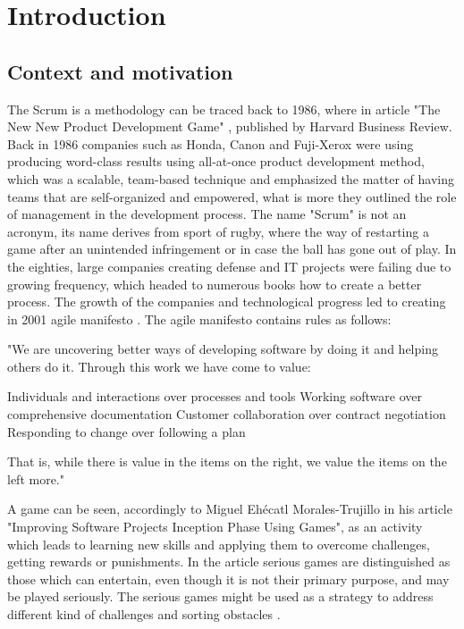 \chapter{Introduction}
\section{Context and motivation}
The Scrum is a methodology can be traced back to 1986, where in article "The New New Product Development Game" \cite{ScrumHarvardBib, ScrumBook}, published by Harvard Business Review. Back in 1986 companies such as Honda, Canon and Fuji-Xerox were using producing word-class results using all-at-once product development method, which was a scalable, team-based technique and emphasized the matter of having teams that are self-organized and empowered, what is more they outlined the role of management in the development process. The name "Scrum" is not an acronym, its name derives from sport of rugby, where the way of restarting a game after an unintended infringement or in case the ball has gone out of play. In the eighties, large companies creating defense and IT projects were failing due to growing frequency, which headed to numerous books how to create a better process. The growth of the companies and technological progress led to creating in 2001 agile manifesto \cite{AgileManifesto, AgileBook}. The agile manifesto contains rules as follows:

"We are uncovering better ways of developing
software by doing it and helping others do it.
Through this work we have come to value:

Individuals and interactions over processes and tools \hfill \break
Working software over comprehensive documentation \hfill \break
Customer collaboration over contract negotiation \hfill \break
Responding to change over following a plan \hfill \break

That is, while there is value in the items on
the right, we value the items on the left more." \cite{AgileManifesto}

A game can be seen, accordingly to Miguel Ehécatl Morales-Trujillo in his article "Improving Software Projects Inception Phase Using Games", as an activity which leads to learning new skills and applying them to overcome challenges, getting rewards or punishments. In the article serious games are distinguished as those which can entertain, even though it is not their primary purpose, and may be played seriously. The serious games might be used as a strategy to address different kind of challenges and sorting obstacles \cite{MiguelGames}.

